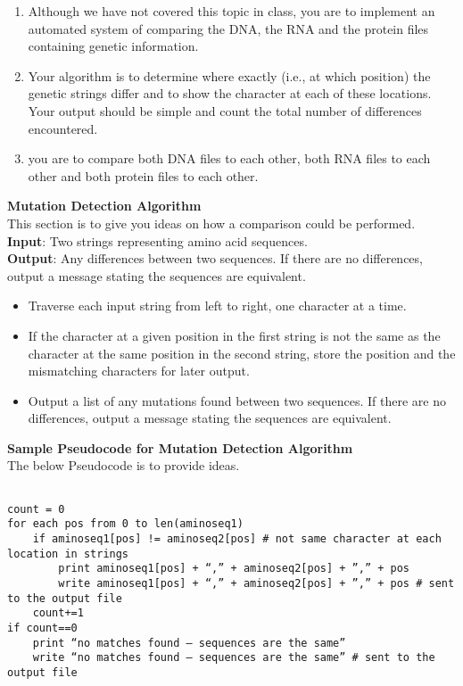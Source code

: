 \begin{enumerate}
\begin{enumerate}
	\item Although we have not covered this topic in class, you are to implement an automated system of comparing the DNA, the RNA and the protein files containing genetic information. 

	\item Your algorithm is to determine where exactly (i.e., at which position) the genetic strings differ and to show the character at each of these locations. Your output should be simple and count the total number of differences encountered.
	\item you are to compare both DNA files to each other, both RNA files to each other and both protein files to each other.
	
  \end{enumerate}

\end{enumerate}




\noindent \textbf{Mutation Detection Algorithm} \\
This section is to give you ideas on how a comparison could be performed.
\noindent \textbf{Input}: Two strings representing amino acid sequences. \\
\textbf{Output}: Any differences between two sequences. If there are no differences, output a message stating the sequences are equivalent.  \\
\begin{itemize}
	\item  Traverse each input string from left to right, one character at a time.
	\item If the character at a given position in the first string is not the same as the character at the same position in the second string, store the position and the mismatching characters for later output.
	\item Output a list of any mutations found between two sequences. If there are no differences, output a message stating the sequences are equivalent.
\end{itemize}



\noindent \textbf{Sample Pseudocode for Mutation Detection Algorithm} \\
The below Pseudocode is to provide ideas.
\begin{verbatim}

count = 0
for each pos from 0 to len(aminoseq1)
    if aminoseq1[pos] != aminoseq2[pos] # not same character at each location in strings
        print aminoseq1[pos] + “,” + aminoseq2[pos] + ”,” + pos
        write aminoseq1[pos] + “,” + aminoseq2[pos] + ”,” + pos # sent to the output file
    count+=1
if count==0
    print “no matches found – sequences are the same”
    write “no matches found – sequences are the same” # sent to the output file

\end{verbatim}



